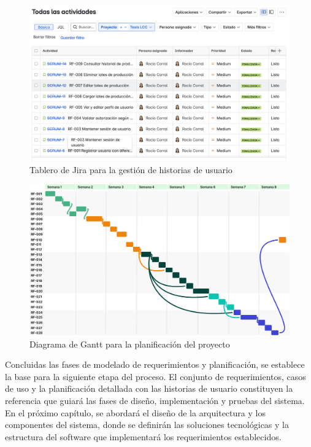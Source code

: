 \begin{figure}[!htb]
  \centering
  \includegraphics[width=\textwidth]{Figures/jira-board.png}
  \caption{Tablero de Jira para la gestión de historias de usuario}
  \label{fig:jira-board}
\end{figure}

\begin{figure}[!htb]
  \centering
  \includegraphics[width=\textwidth]{Figures/gantt-chart.png}
  \caption{Diagrama de Gantt para la planificación del proyecto}
  \label{fig:gantt-chart}
\end{figure}

Concluidas las fases de modelado de requerimientos y planificación, se establece la base para la siguiente etapa del proceso. El conjunto de requerimientos, casos de uso y la planificación detallada con las historias de usuario constituyen la referencia que guiará las fases de diseño, implementación y pruebas del sistema. En el próximo capítulo, se abordará el diseño de la arquitectura y los componentes del sistema, donde se definirán las soluciones tecnológicas y la estructura del software que implementará los requerimientos establecidos.
